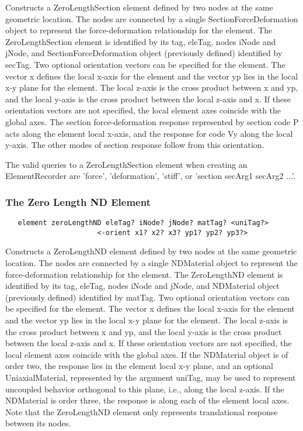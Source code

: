 \documentclass[12pt]{article}
\begin{document}
\noindent Constructs a ZeroLengthSection element defined by two nodes at the
same geometric location. The nodes are connected by a single
SectionForceDeformation object to represent the force-deformation
relationship for the element. The ZeroLengthSection element is identified
by its tag, eleTag, nodes iNode and jNode, and SectionForceDeformation object
(previously defined) identified by secTag. Two optional orientation vectors can be
specified for the element. The vector x defines the local x-axis for
the element and the vector yp lies in the local x-y plane for the
element. The local z-axis is the cross product between x and yp, and
the local y-axis is the cross product between the local z-axis and x.
If these orientation vectors are not specified, the local element axes
coincide with the global axes. The section force-deformation response
represented by section code P acts along the element local x-axis, and
the response for code Vy along the local y-axis. The other modes of
section response follow from this orientation.

The valid queries to a ZeroLengthSection element when creating an ElementRecorder
are 'force', 'deformation', 'stiff', or 'section secArg1 secArg2 ...'.

\subsubsection{The Zero Length ND Element}
{\sf\small
\begin{verbatim}
   element zeroLengthND eleTag? iNode? jNode? matTag? <uniTag?>
                      <-orient x1? x2? x3? yp1? yp2? yp3?>
\end{verbatim}
}

\noindent Constructs a ZeroLengthND element defined by two nodes at the
same geometric location. The nodes are connected by a single
NDMaterial object to represent the force-deformation
relationship for the element.
The ZeroLengthND element is identified
by its tag, eleTag, nodes iNode and jNode, and NDMaterial object
(previously defined) identified by matTag. Two optional orientation vectors can be
specified for the element. The vector x defines the local x-axis for
the element and the vector yp lies in the local x-y plane for the
element. The local z-axis is the cross product between x and yp, and
the local y-axis is the cross product between the local z-axis and x.
If these orientation vectors are not specified, the local element axes
coincide with the global axes.
If the NDMaterial object is of order two, the response lies in the
element local x-y plane, and an optional UniaxialMaterial, represented
by the argument uniTag, may be used
to represent uncoupled behavior orthogonal to this plane, i.e., along the local
z-axis. If the NDMaterial is order three, the response is along
each of the element local axes. Note that the ZeroLengthND element
only represents translational response between its nodes.
\end{document}
